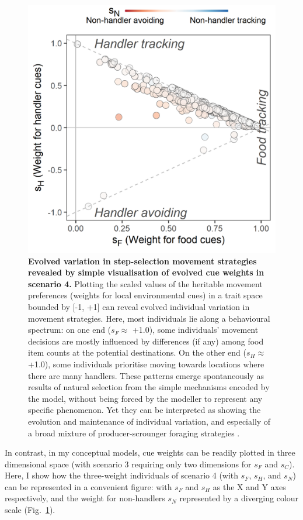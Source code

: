 \begin{interludeenv}
\begin{figure}[h]
    \centering
    \includegraphics[width=0.7\linewidth]{figures/introduction/fig_hypervolume.png}
    \caption{
        \textbf{Evolved variation in step-selection movement strategies revealed by simple visualisation of evolved cue weights in scenario 4.}
        Plotting the scaled values of the heritable movement preferences (weights for local environmental cues) in a trait space bounded by [-1, +1] can reveal evolved individual variation in movement strategies. Here, most individuals lie along a behavioural spectrum: on one end ($s_F \approx$ +1.0), some individuals' movement decisions are mostly influenced by differences (if any) among food item counts at the potential destinations. On the other end ($s_H \approx$ +1.0), some individuals prioritise moving towards locations where there are many handlers.
        These patterns emerge spontaneously as results of natural selection from the simple mechanisms encoded by the model, without being forced by the modeller to represent any specific phenomenon. Yet they can be interpreted as showing the evolution and maintenance of individual variation, and especially of a broad mixture of producer-scrounger foraging strategies \parencite{beauchamp2008}.
    }
    \label{fig:demo_hypervolume}
  \end{figure}

In contrast, in my conceptual models, cue weights can be readily plotted in three dimensional space (with scenario 3 requiring only two dimensions for $s_F$ and $s_C$).
Here, I show how the three-weight individuals of scenario 4 (with $s_F$, $s_H$, and $s_N$) can be represented in a convenient figure: with $s_F$ and $s_H$ as the X and Y axes respectively, and the weight for non-handlers $s_N$ represented by a diverging colour scale (Fig.~\ref{fig:demo_hypervolume}).


\end{interludeenv}
